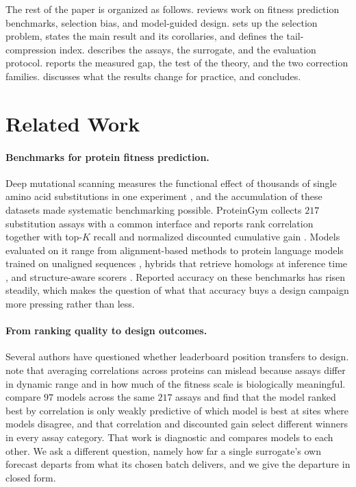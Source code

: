 \documentclass{article}
\theoremstyle{plain}
\theoremstyle{definition}
\begin{document}
The rest of the paper is organized as follows.  reviews work on
fitness prediction benchmarks, selection bias, and model-guided design.
 sets up the selection problem, states the main result and its
corollaries, and defines the tail-compression index.  describes the
assays, the surrogate, and the evaluation protocol.  reports the
measured gap, the test of the theory, and the two correction families.
 discusses what the results change for practice, and
 concludes.

\section{Related Work}
\label{sec:related}

\paragraph{Benchmarks for protein fitness prediction.}
Deep mutational scanning measures the functional effect of thousands of single amino
acid substitutions in one experiment \citep{fowler2014deep}, and the accumulation of
these datasets made systematic benchmarking possible. ProteinGym collects $217$
substitution assays with a common interface and reports rank correlation together with
top-$K$ recall and normalized discounted cumulative gain \citep{notin2023proteingym}.
Models evaluated on it range from alignment-based methods \citep{hopf2017mutation,
frazer2021disease} to protein language models trained on unaligned sequences
\citep{rives2021biological, lin2023evolutionary, elnaggar2021prottrans,
madani2023large}, hybrids that retrieve homologs at inference time
\citep{notin2022tranception}, and structure-aware scorers \citep{meier2021language,
cheng2023accurate}. Reported accuracy on these benchmarks has risen steadily, which
makes the question of what that accuracy buys a design campaign more pressing rather
than less.

\paragraph{From ranking quality to design outcomes.}
Several authors have questioned whether leaderboard position transfers to design.
\citet{notin2023proteingym} note that averaging correlations across proteins can
mislead because assays differ in dynamic range and in how much of the fitness scale is
biologically meaningful. \citet{wang2026goodfilters} compare $97$ models across the
same $217$ assays and find that the model ranked best by correlation is only weakly
predictive of which model is best at sites where models disagree, and that correlation
and discounted gain select different winners in every assay category. That work is
diagnostic and compares models to each other. We ask a different question, namely how
far a single surrogate's own forecast departs from what its chosen batch delivers, and
we give the departure in closed form.
\end{document}
